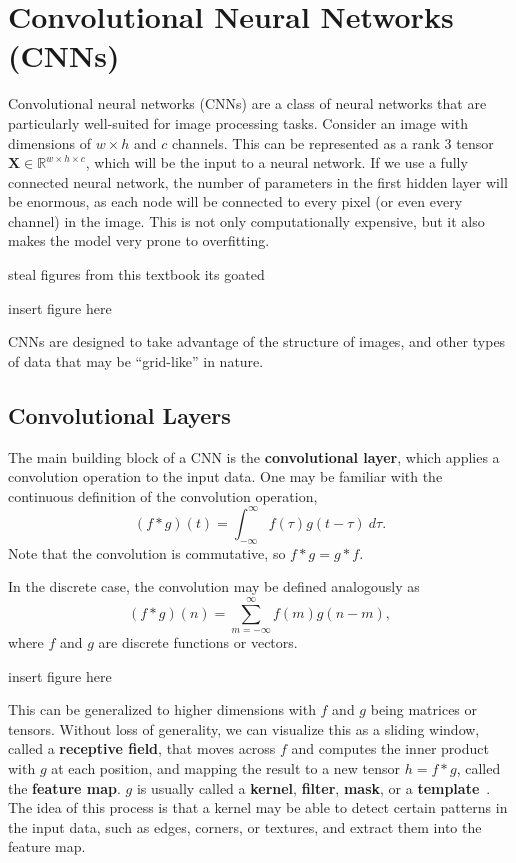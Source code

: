 \documentclass[12pt]{report}
\theoremstyle{definition}
\theoremstyle{remark}
\begin{document}
\section{Convolutional Neural Networks (CNNs)}\label{sec:cnn}
Convolutional neural networks (CNNs) are a class of neural networks that are particularly well-suited for image processing tasks. Consider an image with dimensions of $w \times h$ and $c$ channels. This can be represented as a rank $3$ tensor $\mathbf{X} \in \mathbb{R}^{w \times h \times c}$, which will be the input to a neural network. If we use a fully connected neural network, the number of parameters in the first hidden layer will be enormous, as each node will be connected to every pixel (or even every channel) in the image. This is not only computationally expensive, but it also makes the model very prone to overfitting.

\cite{bishop_deep_2023} steal figures from this textbook its goated

insert figure here

CNNs are designed to take advantage of the structure of images, and other types of data that may be ``grid-like'' in nature.
\subsection{Convolutional Layers}
The main building block of a CNN is the \textbf{convolutional layer}, which applies a convolution operation to the input data. One may be familiar with the continuous definition of the convolution operation,
\begin{equation}
    (f * g)(t) = \int_{-\infty}^{\infty} f(\tau) g(t - \tau)\ d\tau.
\end{equation}
Note that the convolution is commutative, so $f * g = g * f$.

In the discrete case, the convolution may be defined analogously as
\begin{equation}\label{eq:discrete-convolution}
    (f * g)(n) = \sum_{m=-\infty}^{\infty} f(m) g(n - m),
\end{equation}
where $f$ and $g$ are discrete functions or vectors.

insert figure here

This can be generalized to higher dimensions with $f$ and $g$ being matrices or tensors. Without loss of generality, we can visualize this as a sliding window, called a \textbf{receptive field}, that moves across $f$ and computes the inner product with $g$ at each position, and mapping the result to a new tensor $h = f * g$, called the \textbf{feature map}. $g$ is usually called a \textbf{kernel}, \textbf{filter}, \textbf{mask}, or a \textbf{template}~\cite{moon_general_2025}. The idea of this process is that a kernel may be able to detect certain patterns in the input data, such as edges, corners, or textures, and extract them into the feature map.
\end{document}
